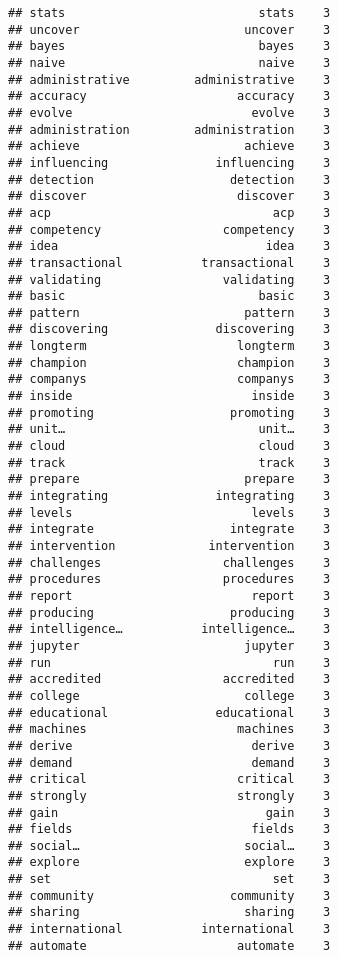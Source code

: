 \documentclass[]{article}
\begin{document}
\begin{verbatim}
## stats                           stats    3
## uncover                       uncover    3
## bayes                           bayes    3
## naive                           naive    3
## administrative         administrative    3
## accuracy                     accuracy    3
## evolve                         evolve    3
## administration         administration    3
## achieve                       achieve    3
## influencing               influencing    3
## detection                   detection    3
## discover                     discover    3
## acp                               acp    3
## competency                 competency    3
## idea                             idea    3
## transactional           transactional    3
## validating                 validating    3
## basic                           basic    3
## pattern                       pattern    3
## discovering               discovering    3
## longterm                     longterm    3
## champion                     champion    3
## companys                     companys    3
## inside                         inside    3
## promoting                   promoting    3
## unit…                           unit…    3
## cloud                           cloud    3
## track                           track    3
## prepare                       prepare    3
## integrating               integrating    3
## levels                         levels    3
## integrate                   integrate    3
## intervention             intervention    3
## challenges                 challenges    3
## procedures                 procedures    3
## report                         report    3
## producing                   producing    3
## intelligence…           intelligence…    3
## jupyter                       jupyter    3
## run                               run    3
## accredited                 accredited    3
## college                       college    3
## educational               educational    3
## machines                     machines    3
## derive                         derive    3
## demand                         demand    3
## critical                     critical    3
## strongly                     strongly    3
## gain                             gain    3
## fields                         fields    3
## social…                       social…    3
## explore                       explore    3
## set                               set    3
## community                   community    3
## sharing                       sharing    3
## international           international    3
## automate                     automate    3

\end{verbatim}
\end{document}
